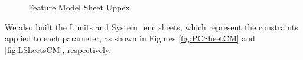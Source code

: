\begin{figure}[H]
    \centering
    \begin{minipage}{0.5\textwidth}
        \centering
        \caption{Feature Model Sheet Uppex}
        \label{fig:cof_FM}
    \end{minipage}
\end{figure}


We also built the Limits and System\_enc sheets, which represent the constraints applied to each parameter, as shown in Figures \ref{fig:PCSheetCM} and \ref{fig:LSheetsCM}, respectively.



